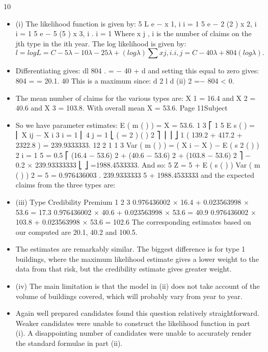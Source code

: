 \documentclass[a4paper,12pt]{article}
\begin{document}
10
\begin{itemize}
\item (i)
The likelihood function is given by:
5
L \propto \product e −\lambda \lambda
x 1, i
i = 1
5
\product e − 2 \lambda (2 \lambda )
x 2, i
i = 1
5
\product e − 5 \lambda (5 \lambda )
x 3, i
.
i = 1
Where x j , i is the number of claims on the jth type in the ith year.
The log likelihood is given by:
\[
l = log L = C − 5 \lambda − 10 \lambda − 25 \lambda + (log \lambda ) \sum  x j , i .
i , j
= C − 40 \lambda + 804(log \lambda ) .\]
\item  Differentiating gives:
dl
804
.
= − 40 +
d \lambda
\lambda
and setting this equal to zero gives:
804
\hat{\lambda} =
= 20.1.
40
This is a maximum since:
d 2 l
d \lambda
(ii)
2
=−
804
< 0.
\item  The mean number of claims for the various types are:
X 1 = 16.4 and X 2 = 40.6 and X 3 = 103.8.
With overall mean X = 53.6.
Page 11Subject %
\item  So we have parameter estimates:
E ( m ( \theta  ) ) = X = 53.6.
1 3 ⎡ 1 5
E s ( \theta  ) = \sum  ⎢ \sum  X ij − X i
3 i = 1 ⎢ 4 j = 1
⎣
(
=
2
)
(
)
2 ⎤
⎥
⎥ ⎦
1
( 139.2 + 417.2 + 2322.8 ) = 239.9333333.
12
2 1
1 3
Var ( m ( \theta  ) ) = \sum  ( X i − X ) − E ( s 2 ( \theta  ) )
2 i = 1
5
= 0.5 ⎡ (16.4 − 53.6) 2 + (40.6 − 53.6) 2 + (103.8 − 53.6) 2 ⎤ − 0.2 × 239.93333333
⎣
⎦
=1988.4533333.
And so:
5
Z =
5 +
E ( s ( \theta  ) )
Var ( m ( \theta  ) )
2
=
5
= 0.976436003 .
239.9333333
5 +
1988.4533333
and the expected claims from the three types are:
\item  (iii)
Type Credibility Premium
1
2
3 0.976436002 × 16.4 + 0.023563998 × 53.6 = 17.3
0.976436002 × 40.6 + 0.023563998 × 53.6 = 40.9
0.976436002 × 103.8 + 0.023563998 × 53.6 = 102.6
The corresponding estimates based on our computed \hat{\lambda}   are 20.1, 40.2 and
100.5.
\item  The estimates are remarkably similar. The biggest difference is for type 1
buildings, where the maximum likelihood estimate gives a lower weight to the
data from that risk, but the credibility estimate gives greater weight.
\item (iv)
The main limitation is that the model in (ii) does not take account of the
volume of buildings covered, which will probably vary from year to year.
\item Again well prepared candidates found this question relatively straightforward. Weaker
candidates were unable to construct the likelihood function in part (i). A disappointing
number of candidates were unable to accurately render the standard formulae in part (ii).
\end{itemize}
\end{document}

